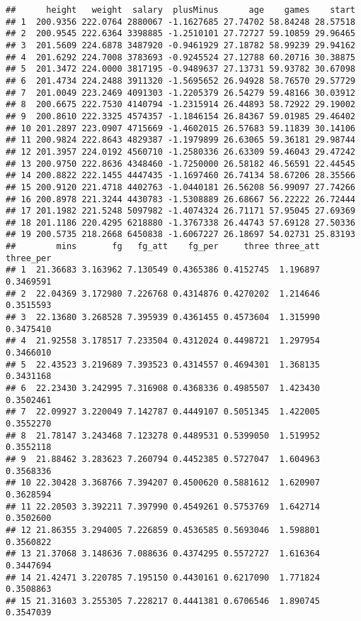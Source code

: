 \documentclass[]{article}
\begin{document}
\begin{verbatim}
##      height   weight  salary  plusMinus      age    games    start
## 1  200.9356 222.0764 2880067 -1.1627685 27.74702 58.84248 28.57518
## 2  200.9545 222.6364 3398885 -1.2510101 27.72727 59.10859 29.96465
## 3  201.5609 224.6878 3487920 -0.9461929 27.18782 58.99239 29.94162
## 4  201.6292 224.7008 3783693 -0.9245524 27.12788 60.20716 30.38875
## 5  201.3472 224.0000 3817195 -0.9489637 27.13731 59.93782 30.67098
## 6  201.4734 224.2488 3911320 -1.5695652 26.94928 58.76570 29.57729
## 7  201.0049 223.2469 4091303 -1.2205379 26.54279 59.48166 30.03912
## 8  200.6675 222.7530 4140794 -1.2315914 26.44893 58.72922 29.19002
## 9  200.8610 222.3325 4574357 -1.1846154 26.84367 59.01985 29.46402
## 10 201.2897 223.0907 4715669 -1.4602015 26.57683 59.11839 30.14106
## 11 200.9824 222.8643 4829387 -1.1979899 26.63065 59.36181 29.98744
## 12 201.3957 224.0192 4560710 -1.2580336 26.63309 59.46043 29.47242
## 13 200.9750 222.8636 4348460 -1.7250000 26.58182 46.56591 22.44545
## 14 200.8822 222.1455 4447435 -1.1697460 26.74134 58.67206 28.35566
## 15 200.9120 221.4718 4402763 -1.0440181 26.56208 56.99097 27.74266
## 16 200.8978 221.3244 4430783 -1.5308889 26.68667 56.22222 26.72444
## 17 201.1982 221.5248 5097982 -1.4074324 26.71171 57.95045 27.69369
## 18 201.1186 220.4295 6218880 -1.3767338 26.44743 57.69128 27.50336
## 19 200.5735 218.2668 6450838 -1.6067227 26.18697 54.02731 25.83193
##        mins       fg   fg_att    fg_per     three three_att three_per
## 1  21.36683 3.163962 7.130549 0.4365386 0.4152745  1.196897 0.3469591
## 2  22.04369 3.172980 7.226768 0.4314876 0.4270202  1.214646 0.3515593
## 3  22.13680 3.268528 7.395939 0.4361455 0.4573604  1.315990 0.3475410
## 4  21.92558 3.178517 7.233504 0.4312024 0.4498721  1.297954 0.3466010
## 5  22.43523 3.219689 7.393523 0.4314557 0.4694301  1.368135 0.3431168
## 6  22.23430 3.242995 7.316908 0.4368336 0.4985507  1.423430 0.3502461
## 7  22.09927 3.220049 7.142787 0.4449107 0.5051345  1.422005 0.3552270
## 8  21.78147 3.243468 7.123278 0.4489531 0.5399050  1.519952 0.3552118
## 9  21.88462 3.283623 7.260794 0.4452385 0.5727047  1.604963 0.3568336
## 10 22.30428 3.368766 7.394207 0.4500620 0.5881612  1.620907 0.3628594
## 11 22.20503 3.392211 7.397990 0.4549261 0.5753769  1.642714 0.3502600
## 12 21.86355 3.294005 7.226859 0.4536585 0.5693046  1.598801 0.3560822
## 13 21.37068 3.148636 7.088636 0.4374295 0.5572727  1.616364 0.3447694
## 14 21.42471 3.220785 7.195150 0.4430161 0.6217090  1.771824 0.3508863
## 15 21.31603 3.255305 7.228217 0.4441381 0.6706546  1.890745 0.3547039

\end{verbatim}
\end{document}
